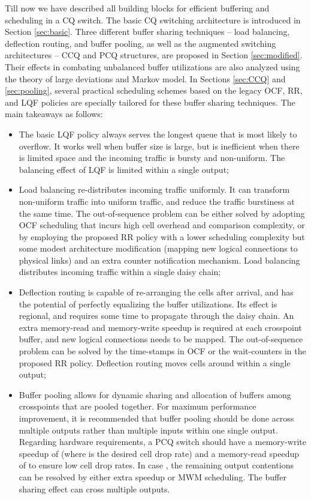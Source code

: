\documentclass[journal,final,doublecolumn,10pt,twoside]{IEEEtranTCOM} \normalsize
\begin{document}
Till now we have described all building blocks for efficient buffering and scheduling in a CQ switch. The basic CQ switching architecture is introduced in Section \ref{sec:basic}. Three different buffer sharing techniques -- load balancing, deflection routing, and buffer pooling, as well as the augmented switching architectures -- CCQ and PCQ structures, are proposed in Section \ref{sec:modified}. Their effects in combating unbalanced buffer utilizations are also analyzed using the theory of large deviations and Markov model. In Sections \ref{sec:CCQ} and \ref{sec:pooling}, several practical scheduling schemes based on the legacy OCF, RR, and LQF policies are specially tailored for these buffer sharing techniques. The main takeaways as follows:
\begin{itemize}
\item The basic LQF policy always serves the longest queue that is most likely to overflow. It works well when buffer size is large, but is inefficient when there is limited space and the incoming traffic is bursty and non-uniform. The balancing effect of LQF is limited within a single output;
\item Load balancing re-distributes incoming traffic uniformly. It can transform non-uniform traffic into uniform traffic, and reduce the traffic burstiness at the same time. The out-of-sequence problem can be either solved by adopting OCF scheduling that incurs high cell overhead and comparison complexity, or by employing the proposed RR policy with a lower scheduling complexity but some modest architecture modification (mapping new logical connections to physical links) and an extra counter notification mechanism. Load balancing distributes incoming traffic within a single daisy chain;
\item Deflection routing is capable of re-arranging the cells after arrival, and has the potential of perfectly equalizing the buffer utilizations. Its effect is regional, and requires some time to propagate through the daisy chain. An extra memory-read and memory-write speedup is required at each crosspoint buffer, and new logical connections needs to be mapped. The out-of-sequence problem can be solved by the time-stamps in OCF or the wait-counters in the proposed RR policy. Deflection routing moves cells around within a single output;
\item Buffer pooling allows for dynamic sharing and allocation of buffers among crosspoints that are pooled together. For maximum performance improvement, it is recommended that buffer pooling should be done across multiple outputs rather than multiple inputs within one single output. Regarding hardware requirements, a  PCQ switch should have a memory-write speedup of  (where  is the desired cell drop rate) and a memory-read speedup of  to ensure low cell drop rates. In case , the remaining  output contentions can be resolved by either extra speedup or MWM scheduling. The buffer sharing effect can cross multiple outputs.
\end{itemize}
\end{document}
